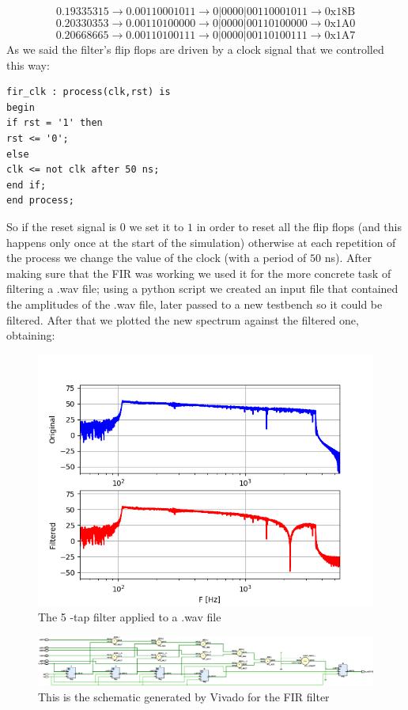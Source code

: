 \documentclass[a4paper,12pt]{article}
\begin{document}
$$0.19335315 \to 0.00110001011 \to 0|0000|00110001011 \to \textrm{0x18B}$$
$$0.20330353 \to 0.00110100000 \to 0|0000|00110100000 \to \textrm{0x1A0}$$
$$0.20668665 \to 0.00110100111 \to 0|0000|00110100111 \to \textrm{0x1A7}$$
As we said the filter's flip flops are driven by a clock signal that we controlled this way:
\begin{lstlisting}[style=vhdl]
fir_clk : process(clk,rst) is
begin
if rst = '1' then
rst <= '0';
else
clk <= not clk after 50 ns;
end if;
end process;
\end{lstlisting}
So if the reset signal is $0$ we set it to $1$ in order to reset all the flip flops (and this happens only once at the start of the simulation) otherwise at each repetition of the process we change the value of the clock (with a period of $50$ ns). After making sure that the FIR was working we used it for the more concrete task of filtering a .wav file; using a python script we created an input file that contained the amplitudes of the .wav file, later passed to a new testbench so it could be filtered. After that we plotted the new spectrum against the filtered one, obtaining:
\begin{figure}[h!]
	\begin{center}
		\includegraphics[width=0.6\linewidth,keepaspectratio]{f_spectrum.png}
	\end{center}	
	\caption{The 5 -tap filter applied to a .wav file}
	\label{fig:fir5ex}
\end{figure}
\begin{figure}
	\begin{center}
		\includegraphics[width=1.7\linewidth,angle=90,origin=c]{schematic.png}
	\end{center}	
	\caption{This is the schematic generated by Vivado for the FIR filter}
	\label{fig:schematic}
\end{figure}
\end{document}
